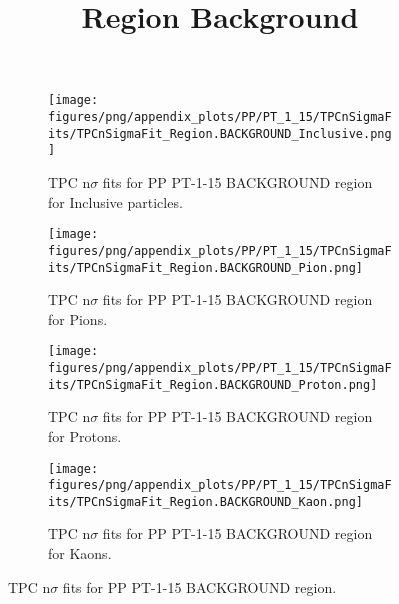             \begin{figure}[H]
                \title{Region Background}
                \begin{subfigure}[b]{0.5\textwidth}
                    \centering
                    \texttt{[image: figures/png/appendix\_plots/PP/PT\_1\_15/TPCnSigmaFits/TPCnSigmaFit\_Region.BACKGROUND\_Inclusive.png]}
                    \caption{TPC n$\sigma$ fits for PP PT-1-15 BACKGROUND region for Inclusive particles.}
                    \label{fig:appendix_PP_PT-1-15_BACKGROUND_Inclusive}
                \end{subfigure}
                \begin{subfigure}[b]{0.5\textwidth}
                    \centering
                    \texttt{[image: figures/png/appendix\_plots/PP/PT\_1\_15/TPCnSigmaFits/TPCnSigmaFit\_Region.BACKGROUND\_Pion.png]}
                    \caption{TPC n$\sigma$ fits for PP PT-1-15 BACKGROUND region for Pions.}
                    \label{fig:appendix_PP_PT-1-15_BACKGROUND_Pion}
                \end{subfigure}
                \begin{subfigure}[b]{0.5\textwidth}
                    \centering
                    \texttt{[image: figures/png/appendix\_plots/PP/PT\_1\_15/TPCnSigmaFits/TPCnSigmaFit\_Region.BACKGROUND\_Proton.png]}
                    \caption{TPC n$\sigma$ fits for PP PT-1-15 BACKGROUND region for Protons.}
                    \label{fig:appendix_PP_PT-1-15_BACKGROUND_Proton}
                \end{subfigure}
                \begin{subfigure}[b]{0.5\textwidth}
                    \centering
                    \texttt{[image: figures/png/appendix\_plots/PP/PT\_1\_15/TPCnSigmaFits/TPCnSigmaFit\_Region.BACKGROUND\_Kaon.png]}
                    \caption{TPC n$\sigma$ fits for PP PT-1-15 BACKGROUND region for Kaons.}
                    \label{fig:appendix_PP_PT-1-15_BACKGROUND_Kaon}
                \end{subfigure}
                \caption{TPC n$\sigma$ fits for PP PT-1-15 BACKGROUND region.}
                \label{fig:appendix_PP_PT-1-15_BACKGROUND}
            \end{figure}
            \clearpage
            
    
